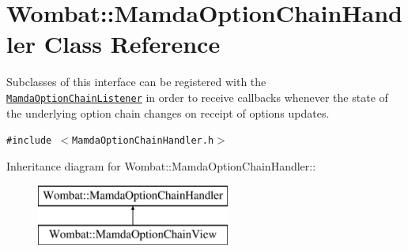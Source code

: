 \hypertarget{classWombat_1_1MamdaOptionChainHandler}{
\section{Wombat::Mamda\-Option\-Chain\-Handler Class Reference}
\label{classWombat_1_1MamdaOptionChainHandler}
}
Subclasses of this interface can be registered with the {\tt \hyperlink{classWombat_1_1MamdaOptionChainListener}{Mamda\-Option\-Chain\-Listener}} in order to receive callbacks whenever the state of the underlying option chain changes on receipt of options updates.  


{\tt \#include $<$Mamda\-Option\-Chain\-Handler.h$>$}

Inheritance diagram for Wombat::Mamda\-Option\-Chain\-Handler::\begin{figure}[H]
\begin{center}
\leavevmode
\includegraphics[height=2cm]{classWombat_1_1MamdaOptionChainHandler}
\end{center}
\end{figure}
